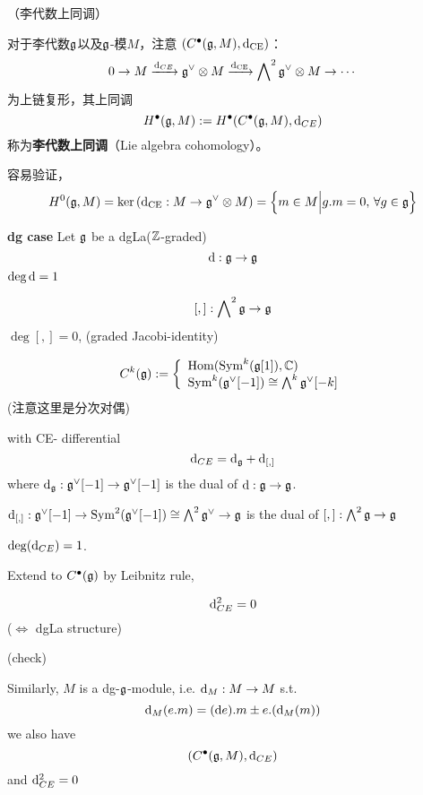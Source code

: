\begin{rem}（李代数上同调）

对于李代数$\mathfrak{g}$以及$\mathfrak{g}$-模$M$，注意
$(C^{\bullet}(\mathfrak{g},M),\mathrm{d}_{\operatorname{CE}})$：
$$0\to M\xrightarrow{\mathrm{d}_{CE}}\mathfrak{g}^\vee\otimes M\xrightarrow{\mathrm{d}_{\operatorname{CE}}}
\bigwedge\nolimits^{2}\mathfrak{g}^\vee \otimes M\to\cdots$$
为上链复形，其上同调
$$H^{\bullet}(\mathfrak{g},M):=H^{\bullet}(C^{\bullet}(\mathfrak{g},M),\mathrm{d}_{CE})$$
称为\textbf{李代数上同调}（Lie algebra cohomology）。
\end{rem}

容易验证，
$$H^0(\mathfrak{g},M)=\ker\left(\mathrm{d}_{\operatorname{CE}}:M\to\mathfrak{g}^\vee\otimes M\right)
=\Big\{ m\in M \Big| g.m=0,\,\forall g\in\mathfrak{g} \Big\}$$



\textbf{dg case}
Let $\mathfrak{g}$ be a dgLa($\mathbb{Z}$-graded)
$$\mathrm{d}:\mathfrak{g}\to\mathfrak{g}$$
$\deg\mathrm{d}=1$

$$[,]:\bigwedge\nolimits^{2}\mathfrak{g}\to\mathfrak{g}$$
$\deg[,]=0$,
(graded Jacobi-identity)

\begin{definition}
$$
  C^k(\mathfrak{g}):=
    \left\{
      \begin{array}{l}
        \operatorname{Hom}(\operatorname{Sym}^k(\mathfrak{g}[1]),\mathbb{C})  \\
        \operatorname{Sym}^k(\mathfrak{g}^\vee[-1])\cong\bigwedge\nolimits^{k}\mathfrak{g}^\vee[-k]
      \end{array}
    \right.
$$
(注意这里是分次对偶)

with CE- differential
$$\mathrm{d}_{CE}=\mathrm{d}_{\mathfrak{g}}+\mathrm{d}_{[,]}$$
where $\mathrm{d}_{\mathfrak{g}}:\mathfrak{g}^\vee[-1]\to\mathfrak{g}^\vee[-1]$ is the dual of $\mathrm{d}:\mathfrak{g}\to\mathfrak{g}$.

$\mathrm{d}_{[,]}:\mathfrak{g}^\vee[-1]\to \operatorname{Sym}^2(\mathfrak{g}^\vee[-1])\cong\bigwedge\nolimits^{2}\mathfrak{g}^\vee\to\mathfrak{g}$
is the dual of $[,]:\bigwedge\nolimits^{2}\mathfrak{g}\to\mathfrak{g}$
\end{definition}

$\deg(\mathrm{d}_{CE})=1$.

Extend to $C^{\bullet}(\mathfrak{g})$ by Leibnitz rule,
\begin{prop}
$$\mathrm{d}_{CE}^2=0$$
($\iff$ dgLa structure)
\end{prop}
(check)

Similarly, $M$ is a dg-$\mathfrak{g}$-module, i.e.
$\mathrm{d}_M:M\to M$ s.t.
$$\mathrm{d}_M(e.m)=(\mathrm{d} e).m\pm e.(\mathrm{d}_M (m))$$
we also have
$$(C^{\bullet}(\mathfrak{g},M),\mathrm{d}_{CE})$$
and $\mathrm{d}_{CE}^2=0$

